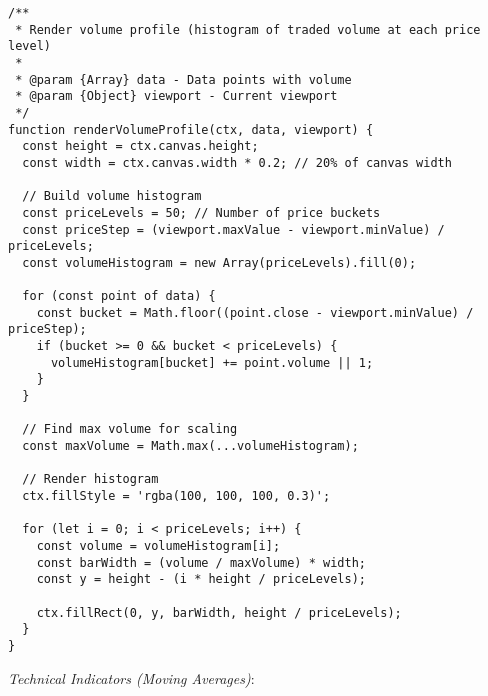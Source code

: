 \documentclass[11pt]{article}
\begin{document}
\begin{verbatim}
/**
 * Render volume profile (histogram of traded volume at each price level)
 * 
 * @param {Array} data - Data points with volume
 * @param {Object} viewport - Current viewport
 */
function renderVolumeProfile(ctx, data, viewport) {
  const height = ctx.canvas.height;
  const width = ctx.canvas.width * 0.2; // 20% of canvas width
  
  // Build volume histogram
  const priceLevels = 50; // Number of price buckets
  const priceStep = (viewport.maxValue - viewport.minValue) / priceLevels;
  const volumeHistogram = new Array(priceLevels).fill(0);
  
  for (const point of data) {
    const bucket = Math.floor((point.close - viewport.minValue) / priceStep);
    if (bucket >= 0 && bucket < priceLevels) {
      volumeHistogram[bucket] += point.volume || 1;
    }
  }
  
  // Find max volume for scaling
  const maxVolume = Math.max(...volumeHistogram);
  
  // Render histogram
  ctx.fillStyle = 'rgba(100, 100, 100, 0.3)';
  
  for (let i = 0; i < priceLevels; i++) {
    const volume = volumeHistogram[i];
    const barWidth = (volume / maxVolume) * width;
    const y = height - (i * height / priceLevels);
    
    ctx.fillRect(0, y, barWidth, height / priceLevels);
  }
}
\end{verbatim}

\emph{Technical Indicators (Moving Averages)}:
\end{document}
